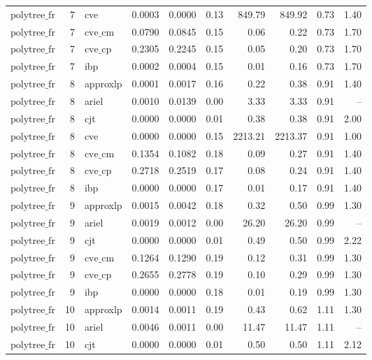 \begin{table}[ht]
\begin{tabular}{lrlrrrrrrr}
$\text{polytree\_fr}$ & 7 & cve & 0.0003 & 0.0000 & 0.13 & 849.79 & 849.92 & 0.73 & 1.40 \\
$\text{polytree\_fr}$ & 7 & $\text{cve\_cm}$ & 0.0790 & 0.0845 & 0.15 & 0.06 & 0.22 & 0.73 & 1.70 \\
$\text{polytree\_fr}$ & 7 & $\text{cve\_cp}$ & 0.2305 & 0.2245 & 0.15 & 0.05 & 0.20 & 0.73 & 1.70 \\
$\text{polytree\_fr}$ & 7 & ibp & 0.0002 & 0.0004 & 0.15 & 0.01 & 0.16 & 0.73 & 1.70 \\
$\text{polytree\_fr}$ & 8 & approxlp & 0.0001 & 0.0017 & 0.16 & 0.22 & 0.38 & 0.91 & 1.40 \\
$\text{polytree\_fr}$ & 8 & ariel & 0.0010 & 0.0139 & 0.00 & 3.33 & 3.33 & 0.91 & -- \\
$\text{polytree\_fr}$ & 8 & cjt & 0.0000 & 0.0000 & 0.01 & 0.38 & 0.38 & 0.91 & 2.00 \\
$\text{polytree\_fr}$ & 8 & cve & 0.0000 & 0.0000 & 0.15 & 2213.21 & 2213.37 & 0.91 & 1.00 \\
$\text{polytree\_fr}$ & 8 & $\text{cve\_cm}$ & 0.1354 & 0.1082 & 0.18 & 0.09 & 0.27 & 0.91 & 1.40 \\
$\text{polytree\_fr}$ & 8 & $\text{cve\_cp}$ & 0.2718 & 0.2519 & 0.17 & 0.08 & 0.24 & 0.91 & 1.40 \\
$\text{polytree\_fr}$ & 8 & ibp & 0.0000 & 0.0000 & 0.17 & 0.01 & 0.17 & 0.91 & 1.40 \\
$\text{polytree\_fr}$ & 9 & approxlp & 0.0015 & 0.0042 & 0.18 & 0.32 & 0.50 & 0.99 & 1.30 \\
$\text{polytree\_fr}$ & 9 & ariel & 0.0019 & 0.0012 & 0.00 & 26.20 & 26.20 & 0.99 & -- \\
$\text{polytree\_fr}$ & 9 & cjt & 0.0000 & 0.0000 & 0.01 & 0.49 & 0.50 & 0.99 & 2.22 \\
$\text{polytree\_fr}$ & 9 & $\text{cve\_cm}$ & 0.1264 & 0.1290 & 0.19 & 0.12 & 0.31 & 0.99 & 1.30 \\
$\text{polytree\_fr}$ & 9 & $\text{cve\_cp}$ & 0.2655 & 0.2778 & 0.19 & 0.10 & 0.29 & 0.99 & 1.30 \\
$\text{polytree\_fr}$ & 9 & ibp & 0.0000 & 0.0000 & 0.18 & 0.01 & 0.19 & 0.99 & 1.30 \\
$\text{polytree\_fr}$ & 10 & approxlp & 0.0014 & 0.0011 & 0.19 & 0.43 & 0.62 & 1.11 & 1.30 \\
$\text{polytree\_fr}$ & 10 & ariel & 0.0046 & 0.0011 & 0.00 & 11.47 & 11.47 & 1.11 & -- \\
$\text{polytree\_fr}$ & 10 & cjt & 0.0000 & 0.0000 & 0.01 & 0.50 & 0.50 & 1.11 & 2.12 \\

\end{tabular}
\end{table}
